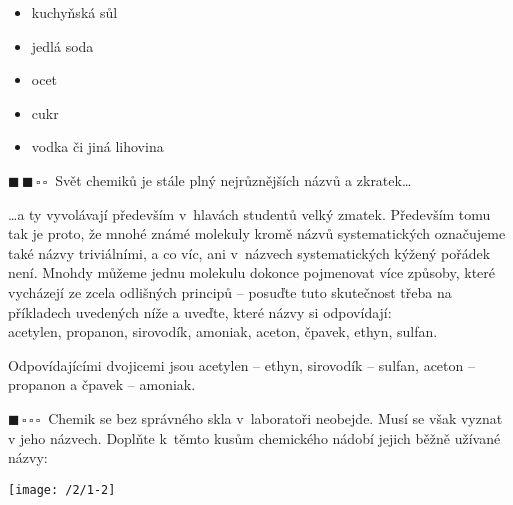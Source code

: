 \documentclass{book}
\newcommand{\jeden}{$\blacksquare \, \square \, \square \, \square \; \; $}
\newcommand{\dva}{$\blacksquare \, \blacksquare \, \square \, \square \; \; $}
\renewenvironment{quotation}{\par}{\par} %
\begin{document}
 \begin{itemize}[topsep=0mm,itemsep=0mm]
 \item [{a)}] kuchyňská sůl
 \item [{b)}] jedlá soda
 \item [{c)}] ocet
 \item [{d)}] cukr
 \item [{e)}] vodka či jiná lihovina
 \end{itemize}

\hrulefill %
\begin{quotation}
\dva Svět chemiků je stále plný nejrůznějších názvů a zkratek\ldots

\ldots\-a ty vyvolávají především v~hlavách studentů velký zmatek. Především
tomu tak je proto, že mnohé známé molekuly kromě názvů systematických
označujeme také názvy triviálními, a co víc, ani v~názvech systematických
kýžený pořádek není. Mnohdy můžeme jednu molekulu dokonce pojmenovat
více způsoby, které vycházejí ze zcela odlišných principů -- posuďte
tuto skutečnost třeba na příkladech uvedených níže a uveďte, které
názvy si odpovídají:\\
acetylen, propanon, sirovodík, amoniak, aceton, čpavek, ethyn, sulfan.
\end{quotation} \dotfill \par 
Odpovídajícími dvojicemi jsou acetylen -- ethyn, sirovodík -- sulfan,
aceton -- propanon a čpavek -- amoniak.

\hrulefill %
\begin{quotation}
\jeden Chemik se bez správného skla v~laboratoři neobejde. Musí se však vyznat
v jeho názvech. Doplňte k~těmto kusům chemického nádobí jejich běžně
užívané názvy:
\end{quotation} \dotfill \par 
\begin{center}
\texttt{[image: /2/1-2]}
\end{center}
\end{document}
